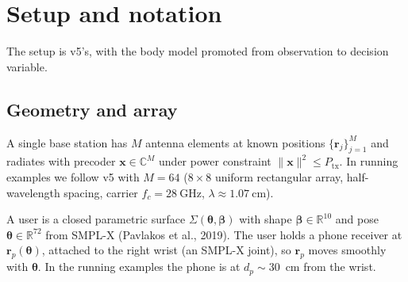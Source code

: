 \documentclass[11pt,a4paper]{article}
\theoremstyle{definition}
\newcommand{\rr}{\mathbf{r}}
\newcommand{\Reals}{\mathbb{R}}
\newcommand{\Complex}{\mathbb{C}}
\newcommand{\xvec}{\mathbf{x}}
\newcommand{\thetab}{\bm{\theta}}
\newcommand{\betab}{\bm{\beta}}
\begin{document}
\section{Setup and notation}\label{sec:setup}

The setup is v5's, with the body model promoted from observation to
decision variable.

\subsection{Geometry and array}

A single base station has $M$ antenna elements at known positions
$\{\rr_j\}_{j=1}^M$ and radiates with precoder $\xvec\in\Complex^M$
under power constraint $\|\xvec\|^2\le P_{\mathrm{tx}}$.  In running
examples we follow v5 with $M=64$ ($8\times 8$ uniform rectangular
array, half-wavelength spacing, carrier $f_c=\SI{28}{\GHz}$,
$\lambda\approx\SI{1.07}{\cm}$).

A user is a closed parametric surface
$\Sigma(\thetab,\betab)$ with shape $\betab\in\Reals^{10}$ and pose
$\thetab\in\Reals^{72}$ from SMPL-X (Pavlakos et al., 2019).  The
user holds a phone receiver at $\rr_p(\thetab)$, attached to the
right wrist (an SMPL-X joint), so $\rr_p$ moves smoothly with
$\thetab$.  In the running examples the phone is at
$d_p\sim$\SI{30}{\cm} from the wrist.
\end{document}

